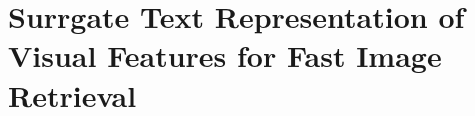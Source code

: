 
\renewcommand{\D}{\mathcal{X}} %
\renewcommand{\N}{{D}} %
\renewcommand{\bb}[1]{\boldsymbol {#1}} %
\renewcommand{\muu}{\bb{\mu}}

\graphicspath{{img/str/}}

\chapter{Surrgate Text Representation of Visual Features for Fast Image Retrieval}
\label{ch:surrogate}


